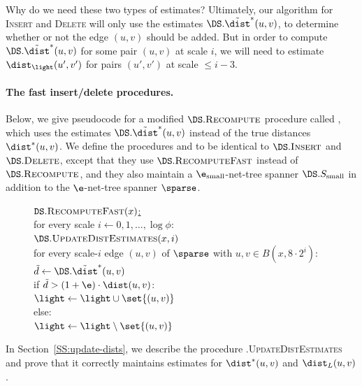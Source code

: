 Why do we need these two types of estimates? Ultimately, our algorithm for \textsc{Insert} and \textsc{Delete} will only use the estimates $\DS.\tilde \dist^*(u,v)$, to determine whether or not the edge $(u,v)$ should be added. But in order to compute $\DS.\tilde \dist^*(u,v)$ for some pair $(u,v)$ at scale $i$, we will need to estimate $\dist_\light(u',v')$ for pairs $(u',v')$ at scale $\le i-3$.
%
\paragraph{The fast insert/delete procedures.}
Below, we give  pseudocode for a modified $\DS.\textsc{Recompute}$ procedure called , which uses the estimates $\DS.\tilde \dist^*(u,v)$ instead of the true distances $\dist^*(u,v)$. We define the procedures  and  to be identical to $\DS.\textsc{Insert}$ and $\DS.\textsc{Delete}$, except that they use $\DS.\textsc{RecomputeFast}$ instead of $\DS.\textsc{Recompute}$, and they also maintain a $\e_{\rm small}$-net-tree spanner $\DS.S_{\rm small}$ in addition to the $\e$-net-tree spanner $\sparse$.
\begin{figure}[h!]
\centering
\begin{algorithm}
    \ul{$\texttt{DS}.\textsc{RecomputeFast}(x)$:}\+
    \\ for every scale $i \gets 0, 1, \ldots, \log \phi$:\+
    \\      $\DS.\textsc{UpdateDistEstimates}(x,i)$ 
    \\      for every scale-$i$ edge $(u,v)$ of $\sparse$ with $u,v \in B(x, 8 \cdot 2^i)$:\+
    \\          $\tilde d \gets \DS.\tilde \dist^*(u,v) $ 
        \\          if $\tilde d > (1+\e) \cdot \dist(u,v)$:\+
    \\  $\light \gets \light \cup \set{(u,v)}$\-
    \\ else:\+
    \\ $\light \gets \light \setminus \set{(u,v)}$\-
\end{algorithm}
\label{fig:recompute-fast}
\end{figure}
% 
%
In Section~\ref{SS:update-dists}, we describe the procedure \DS.\textsc{UpdateDistEstimates} and prove that it correctly maintains estimates for $\dist^*(u,v)$ and $\dist_L(u,v)$.
